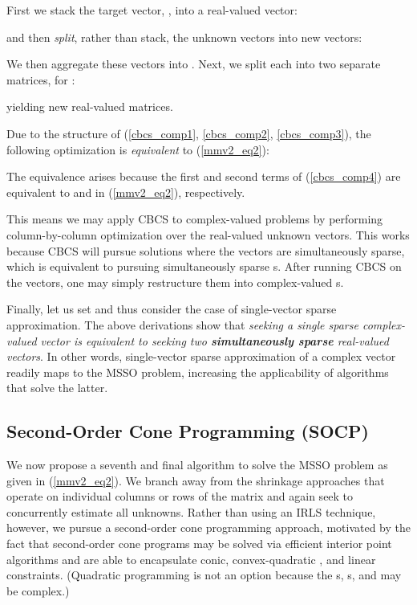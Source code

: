 \documentclass[final]{siamltex}
\newcommand{\la}[1]{\mbox{}}  \newcommand{\sst}[1]{\mbox{\scriptsize{#1}}}
\begin{document}
    First we stack the target vector, \la{d}, into a real-valued vector:
    
    and then {\em{split}}, rather than stack, the unknown vectors into  new vectors:
    
   We then aggregate these vectors into . Next, we split each
    into two separate matrices, for :
   
   yielding  new real-valued matrices.

   Due to the structure of (\ref{cbcs_comp1}, \ref{cbcs_comp2},
   \ref{cbcs_comp3}), the following optimization is {\em{equivalent}}
   to (\ref{mmv2_eq2}):
   
   The equivalence arises because the first and second terms of
   (\ref{cbcs_comp4}) are equivalent to  and  in (\ref{mmv2_eq2}), respectively.

   This means we may apply CBCS to complex-valued problems by
   performing column-by-column optimization over the  real-valued
   unknown vectors.  This works because CBCS will
   pursue solutions where the  vectors are simultaneously sparse, which is
   equivalent to pursuing simultaneously sparse s.  After running CBCS on the  vectors, one may simply
   restructure them into  complex-valued s.

   Finally, let us set  and thus consider the case of
   single-vector sparse approximation.  The above derivations show
   that {\em{seeking a single sparse complex-valued vector is
   equivalent to seeking two {\bf{simultaneously sparse}} real-valued
   vectors}}.  In other words, single-vector sparse approximation of a
   complex vector readily maps to the MSSO problem, increasing the
   applicability of algorithms that solve the latter.

\subsection{Second-Order Cone Programming (SOCP)}
\label{subsec:socp}

    We now propose a seventh and final algorithm to solve the MSSO
    problem as given in (\ref{mmv2_eq2}).  We branch away from the
    shrinkage approaches that operate on individual columns or rows of
    the \la{G} matrix and again seek to concurrently estimate all 
    unknowns.  Rather than using an IRLS technique, however, we pursue
    a second-order cone programming approach, motivated by the fact
    that second-order cone programs may be solved via efficient
    interior point algorithms \cite{SeDuMi, Toh1999} and are able to
    encapsulate conic, convex-quadratic \cite{Nem2001}, and linear
    constraints.  (Quadratic programming is not an option because the
    s, s, and \la{d} may be complex.)
\end{document}
